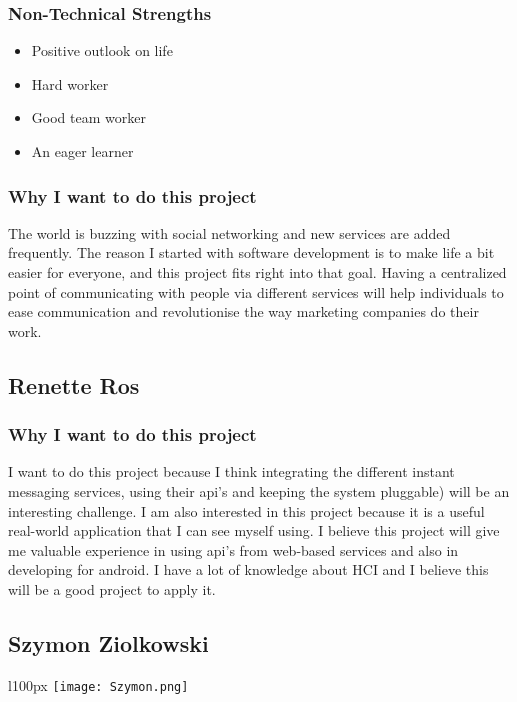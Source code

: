 \subsubsection{Non-Technical Strengths}
\begin{itemize}
	\item{Positive outlook on life}
	\item{Hard worker}
	\item{Good team worker}
	\item{An eager learner}
\end{itemize}
\subsubsection{Why I want to do this project}
The world is buzzing with social networking and new services are added frequently. The reason I started with software development is to make life a bit easier for everyone, and this project fits right into that goal. Having a centralized point of communicating with people via different services will help individuals to ease communication and revolutionise the way marketing companies do their work.

\pagebreak
\subsection{Renette Ros}

\subsubsection{Why I want to do this project} 
I want to do this project because I think integrating the different instant messaging services, using their api's and keeping the system pluggable) will be an interesting challenge.  I am also interested in this project because it is a useful real-world application that I can see myself using. I believe this project will give me valuable experience in using api's from web-based services and also in developing for android. I have a lot of knowledge about HCI and I believe this will be a good project to apply it.
 
\pagebreak
\subsection{Szymon Ziolkowski}
\begin{wrapfigure}[5]{l}{100px}
\vspace{10pt}
\texttt{[image: Szymon.png]}
\end{wrapfigure}

